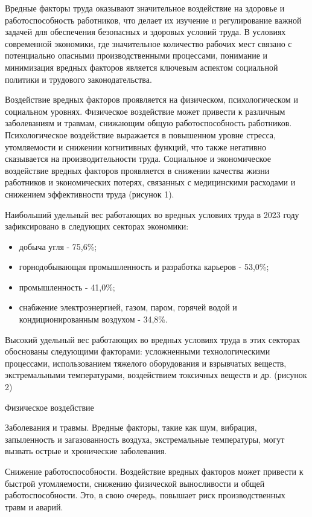 Вредные факторы труда оказывают значительное воздействие на здоровье и
работоспособность работников, что делает их изучение и регулирование
важной задачей для обеспечения безопасных и здоровых условий труда. В
условиях современной экономики, где значительное количество рабочих мест
связано с потенциально опасными производственными процессами, понимание
и минимизация вредных факторов является ключевым аспектом социальной
политики и трудового законодательства.

Воздействие вредных факторов проявляется на физическом, психологическом
и социальном уровнях. Физическое воздействие может привести к различным
заболеваниям и травмам, снижающим общую работоспособность работников.
Психологическое воздействие выражается в повышенном уровне стресса,
утомляемости и снижении когнитивных функций, что также негативно
сказывается на производительности труда. Социальное и экономическое
воздействие вредных факторов проявляется в снижении качества жизни
работников и экономических потерях, связанных с медицинскими расходами и
снижением эффективности труда (рисунок 1).

Наибольший удельный вес работающих во вредных условиях труда в 2023 году
зафиксировано в следующих секторах экономики:

\begin{itemize}
\item
  добыча угля - 75,6\%;
\item
  горнодобывающая промышленность и разработка карьеров - 53,0\%;
\item
  промышленность - 41,0\%;
\item
  снабжение электроэнергией, газом, паром, горячей водой и
  кондиционированным воздухом - 34,8\%.
\end{itemize}

Высокий удельный вес работающих во вредных условиях труда в этих
секторах обоснованы следующими факторами: усложненными технологическими
процессами, использованием тяжелого оборудования и взрывчатых веществ,
экстремальными температурами, воздействием токсичных веществ и др.
(рисунок 2)

Физическое воздействие

Заболевания и травмы. Вредные факторы, такие как шум, вибрация,
запыленность и загазованность воздуха, экстремальные температуры, могут
вызвать острые и хронические заболевания.

Снижение работоспособности. Воздействие вредных факторов может привести
к быстрой утомляемости, снижению физической выносливости и общей
работоспособности. Это, в свою очередь, повышает риск производственных
травм и аварий.

